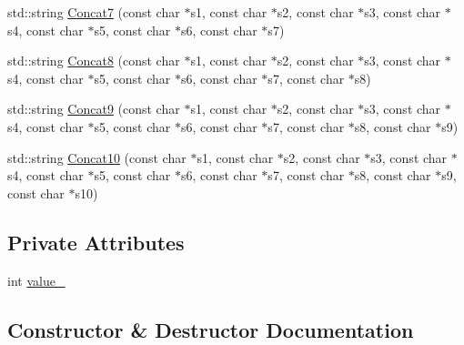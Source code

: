 \begin{DoxyCompactItemize}
\item 
std\+::string \mbox{\hyperlink{classtesting_1_1gmock__more__actions__test_1_1_foo_a5ff9313371e65a91b086afdc2032b0eb}{Concat7}} (const char $\ast$s1, const char $\ast$s2, const char $\ast$s3, const char $\ast$s4, const char $\ast$s5, const char $\ast$s6, const char $\ast$s7)
\item 
std\+::string \mbox{\hyperlink{classtesting_1_1gmock__more__actions__test_1_1_foo_a25b91cea8633d026fe3f4a36c1574b8e}{Concat8}} (const char $\ast$s1, const char $\ast$s2, const char $\ast$s3, const char $\ast$s4, const char $\ast$s5, const char $\ast$s6, const char $\ast$s7, const char $\ast$s8)
\item 
std\+::string \mbox{\hyperlink{classtesting_1_1gmock__more__actions__test_1_1_foo_a8f5b145b0cd23055630b2f9d10b3f45b}{Concat9}} (const char $\ast$s1, const char $\ast$s2, const char $\ast$s3, const char $\ast$s4, const char $\ast$s5, const char $\ast$s6, const char $\ast$s7, const char $\ast$s8, const char $\ast$s9)
\item 
std\+::string \mbox{\hyperlink{classtesting_1_1gmock__more__actions__test_1_1_foo_ad5b1d2dd1bcec98fdc90a05487ec3b14}{Concat10}} (const char $\ast$s1, const char $\ast$s2, const char $\ast$s3, const char $\ast$s4, const char $\ast$s5, const char $\ast$s6, const char $\ast$s7, const char $\ast$s8, const char $\ast$s9, const char $\ast$s10)
\end{DoxyCompactItemize}
\subsection*{Private Attributes}
\begin{DoxyCompactItemize}
\item 
int \mbox{\hyperlink{classtesting_1_1gmock__more__actions__test_1_1_foo_a967ab15b8eefa21c8b07539ec84ef1b8}{value\+\_\+}}
\end{DoxyCompactItemize}


\subsection{Constructor \& Destructor Documentation}
\mbox{\label{classtesting_1_1gmock__more__actions__test_1_1_foo_ad2603a65b94e019c75f4227787b9177e}} 
